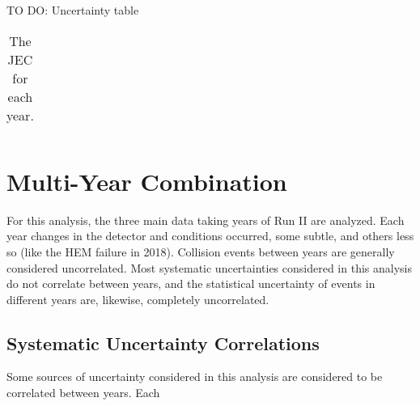 {\color{red} TO DO: Uncertainty table}

\begin{table}[htbp]
  \caption{
    The JEC for each year.
  }
  \centering
  \label{tab:systematics}
  \begin{tabular}{ c l l }
\hline
\hline
  \end{tabular}
\end{table}

\section{Multi-Year Combination}
For this analysis, the three main data taking years of Run II are analyzed. Each year changes in the detector and \LHC conditions occurred, some subtle, and others less so (like the HEM failure in 2018). Collision events between years are generally considered uncorrelated. Most systematic uncertainties considered in this analysis do not correlate between years, and the statistical uncertainty of events in different years are, likewise, completely uncorrelated.

\subsection{Systematic Uncertainty Correlations}
Some sources of uncertainty considered in this analysis are considered to be correlated between years. Each 
